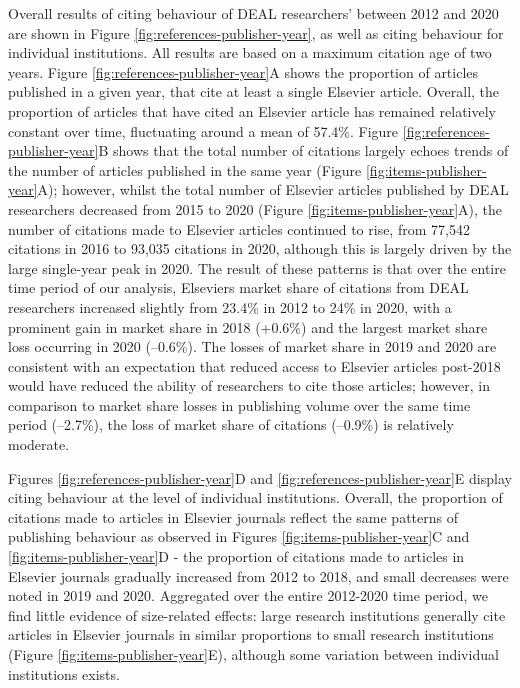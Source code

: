 \documentclass[
]{article}
\begin{document}
Overall results of citing behaviour of DEAL researchers' between 2012 and 2020 are shown in Figure \ref{fig:references-publisher-year}, as well as citing behaviour for individual institutions. All results are based on a maximum citation age of two years. Figure \ref{fig:references-publisher-year}A shows the proportion of articles published in a given year, that cite at least a single Elsevier article. Overall, the proportion of articles that have cited an Elsevier article has remained relatively constant over time, fluctuating around a mean of 57.4\%. Figure \ref{fig:references-publisher-year}B shows that the total number of citations largely echoes trends of the number of articles published in the same year (Figure \ref{fig:items-publisher-year}A); however, whilst the total number of Elsevier articles published by DEAL researchers decreased from 2015 to 2020 (Figure \ref{fig:items-publisher-year}A), the number of citations made to Elsevier articles continued to rise, from 77,542 citations in 2016 to 93,035 citations in 2020, although this is largely driven by the large single-year peak in 2020. The result of these patterns is that over the entire time period of our analysis, Elsevier\textquotesingle s market share of citations from DEAL researchers increased slightly from 23.4\% in 2012 to 24\% in 2020, with a prominent gain in market share in 2018 (+0.6\%) and the largest market share loss occurring in 2020 (--0.6\%). The losses of market share in 2019 and 2020 are consistent with an expectation that reduced access to Elsevier articles post-2018 would have reduced the ability of researchers to cite those articles; however, in comparison to market share losses in publishing volume over the same time period (--2.7\%), the loss of market share of citations (--0.9\%) is relatively moderate.

Figures \ref{fig:references-publisher-year}D and \ref{fig:references-publisher-year}E display citing behaviour at the level of individual institutions. Overall, the proportion of citations made to articles in Elsevier journals reflect the same patterns of publishing behaviour as observed in Figures \ref{fig:items-publisher-year}C and \ref{fig:items-publisher-year}D - the proportion of citations made to articles in Elsevier journals gradually increased from 2012 to 2018, and small decreases were noted in 2019 and 2020. Aggregated over the entire 2012-2020 time period, we find little evidence of size-related effects: large research institutions generally cite articles in Elsevier journals in similar proportions to small research institutions (Figure \ref{fig:items-publisher-year}E), although some variation between individual institutions exists.
\end{document}
